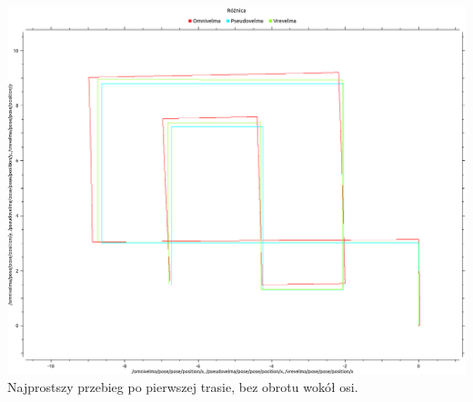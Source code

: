 \documentclass{beamer}
\begin{document}
\begin{frame}
\begin{columns}[c]
			\includegraphics[width=\textwidth]{graphics/track_1.png} \\
			Najprostszy przebieg po pierwszej trasie, bez obrotu wokół osi.
		\end{columns}
	\end{frame}
\end{document}
